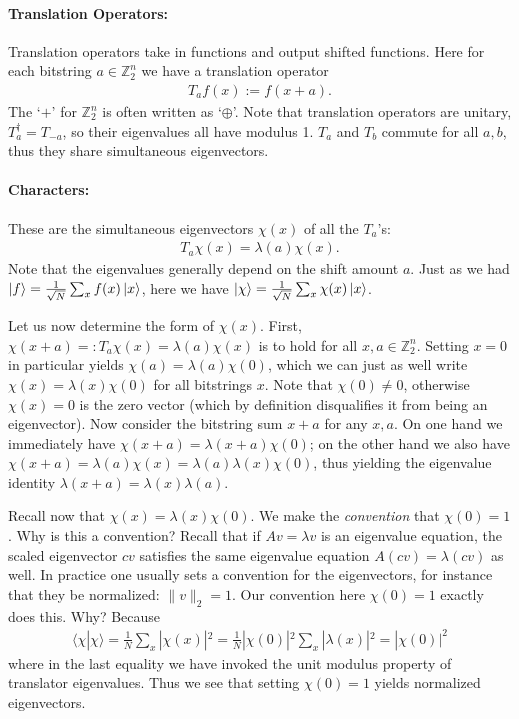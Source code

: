 \paragraph{Translation Operators:} Translation operators take in functions and output shifted functions. Here for each bitstring $a \in \mathbb{Z}_2^n$ we have a translation operator
\begin{align*}
    T_af(x) := f(x+a).
\end{align*}
The `$+$' for $\mathbb{Z}_2^n$ is often written as `$\oplus$'. Note that translation operators are unitary, $T_a^\dag = T_{-a}$, so their eigenvalues all have modulus 1. $T_a$ and $T_b$ commute for all $a,b$, thus they share simultaneous eigenvectors.

\paragraph{Characters:} These are the simultaneous eigenvectors ${\chi(x)}$ of all the $T_a$'s:
\begin{align*}
    T_a\chi(x) = \lambda(a)\chi(x).
\end{align*}
Note that the eigenvalues generally depend on the shift amount $a$. Just as we had $\ket{f} = \frac{1}{\sqrt{N}} \sum_x f(x)\ket{x}$, here we have $\ket{\chi} = \frac{1}{\sqrt{N}} \sum_x \chi(x)\ket{x}$.

Let us now determine the form of $\chi(x)$. First, $\chi(x+a) =: T_a\chi(x) = \lambda(a)\chi(x)$ is to hold for all $x,a \in \mathbb{Z}_2^n$. Setting $x=0$ in particular yields $\chi(a)=\lambda(a)\chi(0)$, which we can just as well write $\chi(x)=\lambda(x)\chi(0)$ for all bitstrings $x$. Note that $\chi(0) \neq 0$, otherwise $\chi(x)=0$ is the zero vector (which by definition disqualifies it from being an eigenvector). Now consider the bitstring sum $x+a$ for any $x,a$. On one hand we immediately have $\chi(x+a)=\lambda(x+a)\chi(0)$; on the other hand we also have $\chi(x+a)=\lambda(a)\chi(x)=\lambda(a)\lambda(x)\chi(0)$, thus yielding the eigenvalue identity $\lambda(x+a)=\lambda(x)\lambda(a)$.

Recall now that $\chi(x)=\lambda(x)\chi(0)$. We make the \textit{convention} that $\chi(0)=1$. Why is this a convention? Recall that if $Av=\lambda v$ is an eigenvalue equation, the scaled eigenvector $cv$ satisfies the same eigenvalue equation $A(cv)=\lambda(cv)$ as well. In practice one usually sets a convention for the eigenvectors, for instance that they be normalized: $\|v\|_2=1$. Our convention here $\chi(0)=1$ exactly does this. Why? Because
\begin{align*}
    \langle \chi|\chi \rangle = \frac{1}{N} \sum_x |\chi(x)|^2 = \frac{1}{N}|\chi(0)|^2 \sum_x |\lambda(x)|^2 = |\chi(0)|^2
\end{align*}
where in the last equality we have invoked the unit modulus property of translator eigenvalues. Thus we see that setting $\chi(0)=1$ yields normalized eigenvectors.

